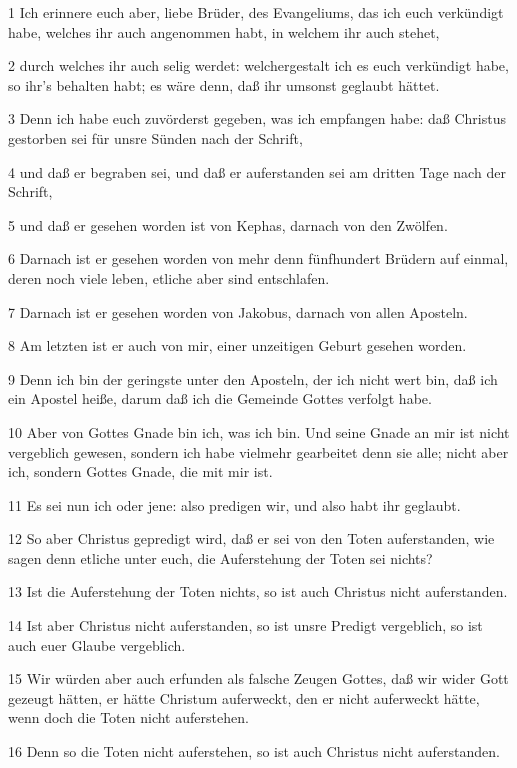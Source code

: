 \par 1 Ich erinnere euch aber, liebe Brüder, des Evangeliums, das ich euch verkündigt habe, welches ihr auch angenommen habt, in welchem ihr auch stehet,
\par 2 durch welches ihr auch selig werdet: welchergestalt ich es euch verkündigt habe, so ihr's behalten habt; es wäre denn, daß ihr umsonst geglaubt hättet.
\par 3 Denn ich habe euch zuvörderst gegeben, was ich empfangen habe: daß Christus gestorben sei für unsre Sünden nach der Schrift,
\par 4 und daß er begraben sei, und daß er auferstanden sei am dritten Tage nach der Schrift,
\par 5 und daß er gesehen worden ist von Kephas, darnach von den Zwölfen.
\par 6 Darnach ist er gesehen worden von mehr denn fünfhundert Brüdern auf einmal, deren noch viele leben, etliche aber sind entschlafen.
\par 7 Darnach ist er gesehen worden von Jakobus, darnach von allen Aposteln.
\par 8 Am letzten ist er auch von mir, einer unzeitigen Geburt gesehen worden.
\par 9 Denn ich bin der geringste unter den Aposteln, der ich nicht wert bin, daß ich ein Apostel heiße, darum daß ich die Gemeinde Gottes verfolgt habe.
\par 10 Aber von Gottes Gnade bin ich, was ich bin. Und seine Gnade an mir ist nicht vergeblich gewesen, sondern ich habe vielmehr gearbeitet denn sie alle; nicht aber ich, sondern Gottes Gnade, die mit mir ist.
\par 11 Es sei nun ich oder jene: also predigen wir, und also habt ihr geglaubt.
\par 12 So aber Christus gepredigt wird, daß er sei von den Toten auferstanden, wie sagen denn etliche unter euch, die Auferstehung der Toten sei nichts?
\par 13 Ist die Auferstehung der Toten nichts, so ist auch Christus nicht auferstanden.
\par 14 Ist aber Christus nicht auferstanden, so ist unsre Predigt vergeblich, so ist auch euer Glaube vergeblich.
\par 15 Wir würden aber auch erfunden als falsche Zeugen Gottes, daß wir wider Gott gezeugt hätten, er hätte Christum auferweckt, den er nicht auferweckt hätte, wenn doch die Toten nicht auferstehen.
\par 16 Denn so die Toten nicht auferstehen, so ist auch Christus nicht auferstanden.
